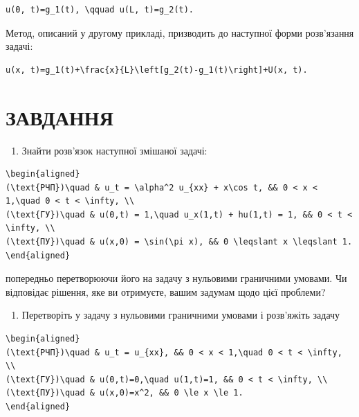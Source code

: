 \documentclass[
  ukrainian,
]{article}
\providecommand{\tightlist}{%
  \setlength{\itemsep}{0pt}\setlength{\parskip}{0pt}}
\begin{document}
\begin{verbatim}
u(0, t)=g_1(t), \qquad u(L, t)=g_2(t).
\end{verbatim}

Метод, описаний у другому прикладі, призводить до наступної форми
розв'язання задачі:

\begin{verbatim}
u(x, t)=g_1(t)+\frac{x}{L}\left[g_2(t)-g_1(t)\right]+U(x, t).
\end{verbatim}

\section{ЗАВДАННЯ}\label{ux437ux430ux432ux434ux430ux43dux43dux44f-3}

\begin{enumerate}
\def\labelenumi{\arabic{enumi}.}
\tightlist
\item
  Знайти розв'язок наступної змішаної задачі:
\end{enumerate}

\begin{verbatim}
\begin{aligned}
(\text{РЧП})\quad & u_t = \alpha^2 u_{xx} + x\cos t, && 0 < x < 1,\quad 0 < t < \infty, \\
(\text{ГУ})\quad & u(0,t) = 1,\quad u_x(1,t) + hu(1,t) = 1, && 0 < t < \infty, \\
(\text{ПУ})\quad & u(x,0) = \sin(\pi x), && 0 \leqslant x \leqslant 1.
\end{aligned}
\end{verbatim}

попередньо перетворюючи його на задачу з нульовими граничними умовами.
Чи відповідає рішення, яке ви отримуєте, вашим задумам щодо цієї
проблеми?

\begin{enumerate}
\def\labelenumi{\arabic{enumi}.}
\setcounter{enumi}{1}
\tightlist
\item
  Перетворіть у задачу з нульовими граничними умовами і розв'яжіть
  задачу
\end{enumerate}

\begin{verbatim}
\begin{aligned}
(\text{РЧП})\quad & u_t = u_{xx}, && 0 < x < 1,\quad 0 < t < \infty, \\
(\text{ГУ})\quad & u(0,t)=0,\quad u(1,t)=1, && 0 < t < \infty, \\
(\text{ПУ})\quad & u(x,0)=x^2, && 0 \le x \le 1.
\end{aligned}
\end{verbatim}
\end{document}
